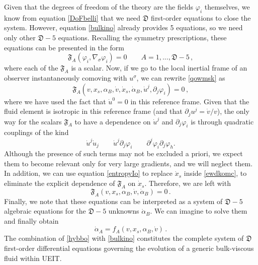 \documentclass[a4paper, amsfonts, amssymb, amsmath, reprint, twocolumn, showkeys, nofootinbib]{revtex4-2}
\begin{document}
Given that the degrees of freedom of the theory are the fields $\varphi_i$ themselves, we know from equation \eqref{DoFbelli} that we need $\mathfrak{D}$ first-order equations to close the system. However, equation \eqref{bulkino} already provides  5 equations, so we need only other $\mathfrak{D}-5$ equations. Recalling the symmetry prescriptions, these equations can be presented in the form
\begin{equation}\label{qowmsk}
\mathfrak{F}_A(\varphi_i , \nabla_\sigma \varphi_i)=0   \quad \quad    A=1,...,\mathfrak{D}-5 \, ,
\end{equation}
where each of the $\mathfrak{F}_A$ is a scalar. 
Now, if we go to the local inertial frame of an observer instantaneously comoving with $u^\sigma$, we can rewrite \eqref{qowmsk} as
\begin{equation}\label{ewdkomc}
\mathfrak{F}_A(v,x_s,\alpha_B , \dot{v},\dot{x}_s,\dot{\alpha}_B, \dot{u}^j, \partial_j \varphi_i)=0 \, ,
\end{equation}
where we have used the fact that $\dot{u}^0=0$ in this reference frame. 
Given that the fluid element is isotropic in this reference frame (and that $\partial_j u^j = \dot{v}/v$), the only way for the scalars $\mathfrak{F}_A$ to have a dependence on $\dot{u}^j$ and $\partial_j \varphi_i$ is through quadratic couplings of the kind
\begin{equation}
\dot{u}^j \dot{u}_j   \quad \quad    \dot{u}^j \partial_j \varphi_i   \quad \quad   \partial^j \varphi_i \partial_j \varphi_{h}.
\end{equation}
Although the presence of such terms may not be excluded a priori, we expect them to become relevant only for very large gradients, and we will neglect them. 
In addition, we can use equation \eqref{entropyIo} to replace $\dot{x}_s$ inside \eqref{ewdkomc}, to eliminate the explicit dependence of $\mathfrak{F}_A$ on $\dot{x}_s$. Therefore, we are left with 
\begin{equation}\label{ewdkomc33}
\mathfrak{F}_A(v,x_s,\alpha_B , \dot{v},\dot{\alpha}_B)=0 \, .
\end{equation}
Finally, we note that these equations can be interpreted as a system of $\mathfrak{D}-5$ algebraic equations for the $\mathfrak{D}-5$ unknowns $\dot{\alpha}_B$.  We can imagine to solve them and finally obtain
\begin{equation}\label{hybbo}
\dot{\alpha}_A = f_A (v,x_s,\alpha_B , \dot{v}) \, .
\end{equation} 
The combination of \eqref{hybbo} with \eqref{bulkino} constitutes the complete system of $\mathfrak{D}$ first-order differential equations governing the evolution of a generic bulk-viscous fluid within UEIT.
\end{document}
